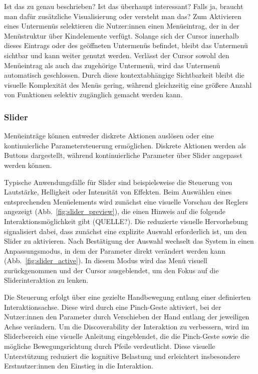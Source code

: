 {\color{red} Ist das zu genau beschrieben? Ist das überhaupt interessant? Falls ja, braucht man dafür zusätzliche Visualisierung oder versteht man das?}
Zum Aktivieren eines Untermenüs selektieren die Nutzer:innen einen Menüeintrag, der in der Menüstruktur über Kindelemente verfügt. Solange sich der Cursor innerhalb dieses Eintrags oder des geöffneten Untermenüs befindet, bleibt das Untermenü sichtbar und kann weiter genutzt werden. 
Verlässt der Cursor sowohl den Menüeintrag als auch das zugehörige Untermenü, wird das Untermenü automatisch geschlossen. Durch diese kontextabhängige Sichtbarkeit bleibt die visuelle Komplexität des Menüs gering, während gleichzeitig eine größere Anzahl von Funktionen selektiv zugänglich gemacht werden kann.

\subsubsection{Slider}
Menüeinträge können entweder diskrete Aktionen auslösen oder eine kontinuierliche Parametersteuerung ermöglichen. Diskrete Aktionen werden als Buttons dargestellt, während kontinuierliche Parameter über Slider angepasst werden können.

Typische Anwendungsfälle für Slider sind beispielsweise die Steuerung von Lautstärke, Helligkeit oder Intensität von Effekten. Beim Auswählen eines entsprechenden Menüelements wird zunächst eine visuelle Vorschau des Reglers angezeigt (Abb.~\ref{fig:slider_preview}), die einen Hinweis auf die folgende Interaktionsmöglichkeit gibt (QUELLE?). Die reduzierte visuelle Hervorhebung signalisiert dabei, dass zunächst eine explizite Auswahl erforderlich ist, um den Slider zu aktivieren. Nach Bestätigung der Auswahl wechselt das System in einen Anpassungsmodus, in dem der Parameter direkt verändert werden kann (Abb.~\ref{fig:slider_active}). In diesem Modus wird das Menü visuell zurückgenommen und der Cursor ausgeblendet, um den Fokus auf die Sliderinteraktion zu lenken.

Die Steuerung erfolgt über eine gezielte Handbewegung entlang einer definierten Interaktionsachse. Diese wird durch eine Pinch-Geste aktiviert, bei der Nutzer:innen den Parameter durch Verschieben der Hand entlang der jeweiligen Achse verändern. Um die Discoverability der Interaktion zu verbessern, wird im Sliderbereich eine visuelle Anleitung eingeblendet, die die Pinch-Geste sowie die mögliche Bewegungsrichtung durch Pfeile verdeutlicht. Diese visuelle Unterstützung reduziert die kognitive Belastung und erleichtert insbesondere Erstnutzer:innen den Einstieg in die Interaktion.

